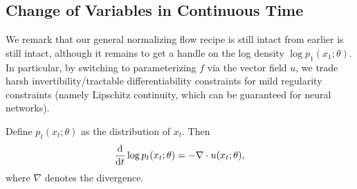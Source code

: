 \documentclass{scrartcl}
\begin{document}
\subsection{Change of Variables in Continuous Time}
We remark that our general normalizing flow recipe is still intact from earlier is still intact, although it remains to get a handle on the log density $\log p_1(x_1; \theta)$. In particular, by switching to parameterizing $f$ via the vector field $u$, we trade harsh invertibility/tractable differentiability constraints for mild regularity constraints (namely Lipschitz continuity, which can be guaranteed for neural networks).

\begin{resultbox}
Define $p_t(x_t;\theta)$ as the distribution of $x_t$. Then 
\begin{equation}
\frac{\d}{\d t} \log p_t(x_t;\theta) = - \nabla \cdot u(x_t; \theta),
\end{equation}
where $\nabla$ denotes the divergence.
\end{resultbox}
\end{document}
